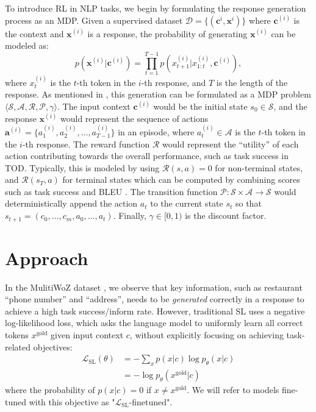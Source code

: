 To introduce RL in NLP tasks, we begin by formulating the response generation process as an MDP. Given a supervised dataset $\mathcal{D} = \{ (\mathbf{c}^{i}, \mathbf{x}^{i}) \}$ where $\mathbf{c}^{(i)}$ is the context and $\mathbf{x}^{(i)}$ is a response, the probability of generating $\mathbf{x}^{(i)}$ can be modeled as:
\[
p(\mathbf{x}^{(i)}|\mathbf{c}^{(i)}) = \prod_{t=1}^{T-1} p(x^{(i)}_{t+1}|x^{(i)}_{1:t},\mathbf{c}^{(i)}),
\] 
where $x_t^{(i)}$ is the $t$-th token in the $i$-th response, and $T$ is the length of the response. As mentioned in \citet{rl4lm,lava}, this generation can be formulated as a MDP problem $\langle \mathcal{S}, \mathcal{A}, \mathcal{R}, \mathcal{P}, \gamma \rangle$. The input context $\mathbf{c}^{(i)}$ would be the initial state $s_{0} \in \mathcal{S}$, and the response $\mathbf{x}^{(i)}$ would represent the sequence of actions $\mathbf{a}^{(i)} = \{a_1^{(i)}, a_2^{(i)}, \dots, a_{T-1}^{(i)}\}$ in an episode, where $a_t^{(i)} \in \mathcal{A}$ is the $t$-th token in the $i$-th response. The reward function $\mathcal{R}$ would represent the ``utility'' of each action contributing towards the overall performance, such as task success in TOD. Typically, this is modeled by using $\mathcal{R}(s,a)=0$ for non-terminal states, and $\mathcal{R}(s_T,a)$ for terminal states which can be computed by combining scores such as task success and BLEU \cite{rl4lm, director}. The transition function $\mathcal{P}: \mathcal{S}\times \mathcal{A}\to \mathcal{S}$ would deterministically append the action $a_t$ to the current state $s_t$ so that $s_{t+1} = (c_0, \dots, c_m, a_0, \dots, a_{t})$. Finally, $\gamma \in [0,1)$ is the discount factor.

\section{Approach}
In the MulitiWoZ dataset \cite{multiwoz,multiwoz2.1, multiwoz2.2}, we observe that key information, such as restaurant ``phone number'' and ``address'', needs to be \emph{generated} correctly in a response to achieve a high task success/inform rate.
However, traditional SL uses a negative log-likelihood loss, which asks the language model to uniformly learn all correct tokens $x^{\mathrm{gold}}$ given input context $c$, without explicitly focusing on achieving task-related objectives:
\begin{equation}\label{eq:lm_loss}
  \begin{split}
    \mathcal{L}_{\mathrm{SL}}(\theta)
    &= - \sum\limits_{x} p(x|c) \log p_\theta(x|c) \\
    &= -\log p_\theta(x^{\mathrm{gold}}|c)
  \end{split}
\end{equation}
where the probability of $p(x|c)=0$ if $x \neq x^{{\mathrm{gold}}}$. We will refer to models fine-tuned with this objective as "$\mathcal{L}_{\mathrm{SL}}$-finetuned".

